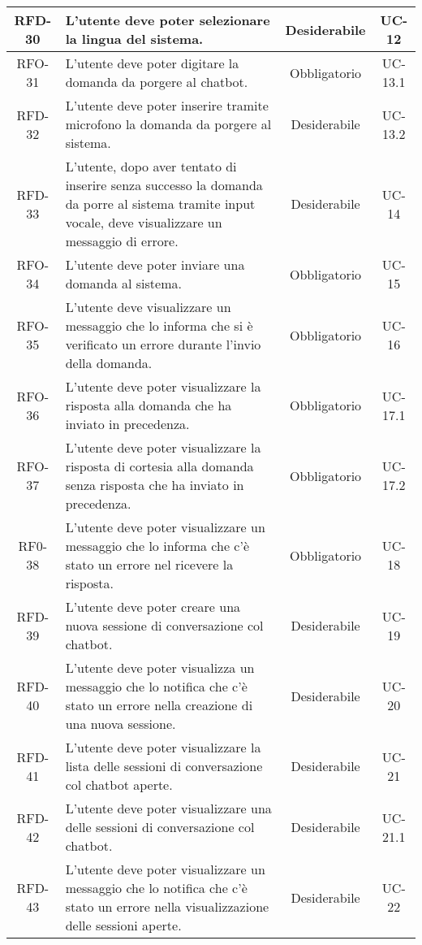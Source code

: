 \begin{xltabular}{\textwidth}{| c | X | c | c |}
    \hline
    RFD-30 & L’utente deve poter selezionare la lingua del sistema. & Desiderabile & UC-12 \\
    \hline
    RFO-31 & L’utente deve poter digitare la domanda da porgere al chatbot. & Obbligatorio & UC-13.1 \\
    \hline
    RFD-32 & L’utente deve poter inserire tramite microfono la domanda da porgere al sistema. & Desiderabile & UC-13.2 \\
    \hline
    RFD-33 & L’utente, dopo aver tentato di inserire senza successo la domanda da porre al sistema tramite input vocale, deve visualizzare un messaggio di errore. & Desiderabile & UC-14 \\
    \hline
    RFO-34 & L’utente deve poter inviare una domanda al sistema. & Obbligatorio & UC-15 \\
    \hline
    RFO-35 & L’utente deve visualizzare un messaggio che lo informa che si è verificato un errore durante l'invio della domanda. & Obbligatorio & UC-16 \\
    \hline
    RFO-36 & L’utente deve poter visualizzare la risposta alla domanda che ha inviato in precedenza. & Obbligatorio & UC-17.1 \\
    \hline
    RFO-37 & L’utente deve poter visualizzare la risposta di cortesia alla domanda senza risposta che ha inviato in precedenza. & Obbligatorio & UC-17.2 \\
    \hline
    RF0-38 & L'utente deve poter visualizzare un messaggio che lo informa che c'è stato un errore nel ricevere la risposta. & Obbligatorio & UC-18 \\
    \hline
    RFD-39 & L’utente deve poter creare una nuova sessione di conversazione col chatbot. & Desiderabile & UC-19 \\
    \hline
    RFD-40 & L'utente deve poter visualizza un messaggio che lo notifica che c'è stato un errore nella creazione di una nuova sessione. & Desiderabile & UC-20 \\
    \hline
    RFD-41 & L’utente deve poter visualizzare la lista delle sessioni di conversazione col chatbot aperte. & Desiderabile & UC-21 \\
    \hline
    RFD-42 & L’utente deve poter visualizzare una delle sessioni di conversazione col chatbot. & Desiderabile & UC-21.1 \\
    \hline
    RFD-43 & L'utente deve poter visualizzare un messaggio che lo notifica che c'è stato un errore nella visualizzazione delle sessioni aperte. & Desiderabile & UC-22 \\

\end{xltabular}
